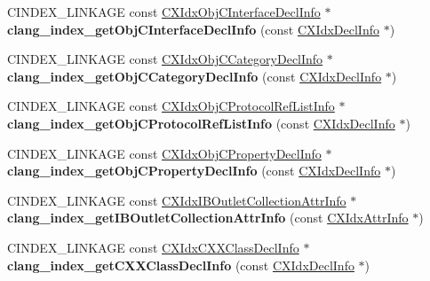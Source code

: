 \begin{DoxyCompactItemize}
C\+I\+N\+D\+E\+X\+\_\+\+L\+I\+N\+K\+A\+GE const \hyperlink{structCXIdxObjCInterfaceDeclInfo}{C\+X\+Idx\+Obj\+C\+Interface\+Decl\+Info} $\ast$ {\bfseries clang\+\_\+index\+\_\+get\+Obj\+C\+Interface\+Decl\+Info} (const \hyperlink{structCXIdxDeclInfo}{C\+X\+Idx\+Decl\+Info} $\ast$)
\item 
\mbox{\label{group__CINDEX__HIGH_gac5301220677a46afd733eb1cffb2909a}} 
C\+I\+N\+D\+E\+X\+\_\+\+L\+I\+N\+K\+A\+GE const \hyperlink{structCXIdxObjCCategoryDeclInfo}{C\+X\+Idx\+Obj\+C\+Category\+Decl\+Info} $\ast$ {\bfseries clang\+\_\+index\+\_\+get\+Obj\+C\+Category\+Decl\+Info} (const \hyperlink{structCXIdxDeclInfo}{C\+X\+Idx\+Decl\+Info} $\ast$)
\item 
\mbox{\label{group__CINDEX__HIGH_ga5c39608c859456cbc78109d010765415}} 
C\+I\+N\+D\+E\+X\+\_\+\+L\+I\+N\+K\+A\+GE const \hyperlink{structCXIdxObjCProtocolRefListInfo}{C\+X\+Idx\+Obj\+C\+Protocol\+Ref\+List\+Info} $\ast$ {\bfseries clang\+\_\+index\+\_\+get\+Obj\+C\+Protocol\+Ref\+List\+Info} (const \hyperlink{structCXIdxDeclInfo}{C\+X\+Idx\+Decl\+Info} $\ast$)
\item 
\mbox{\label{group__CINDEX__HIGH_ga6319eecf732286e2d1c59582bccfad07}} 
C\+I\+N\+D\+E\+X\+\_\+\+L\+I\+N\+K\+A\+GE const \hyperlink{structCXIdxObjCPropertyDeclInfo}{C\+X\+Idx\+Obj\+C\+Property\+Decl\+Info} $\ast$ {\bfseries clang\+\_\+index\+\_\+get\+Obj\+C\+Property\+Decl\+Info} (const \hyperlink{structCXIdxDeclInfo}{C\+X\+Idx\+Decl\+Info} $\ast$)
\item 
\mbox{\label{group__CINDEX__HIGH_ga56c79b1bd72e70149706933a3112f871}} 
C\+I\+N\+D\+E\+X\+\_\+\+L\+I\+N\+K\+A\+GE const \hyperlink{structCXIdxIBOutletCollectionAttrInfo}{C\+X\+Idx\+I\+B\+Outlet\+Collection\+Attr\+Info} $\ast$ {\bfseries clang\+\_\+index\+\_\+get\+I\+B\+Outlet\+Collection\+Attr\+Info} (const \hyperlink{structCXIdxAttrInfo}{C\+X\+Idx\+Attr\+Info} $\ast$)
\item 
\mbox{\label{group__CINDEX__HIGH_gaeba620227e5d19dbe6d23b801c1753a6}} 
C\+I\+N\+D\+E\+X\+\_\+\+L\+I\+N\+K\+A\+GE const \hyperlink{structCXIdxCXXClassDeclInfo}{C\+X\+Idx\+C\+X\+X\+Class\+Decl\+Info} $\ast$ {\bfseries clang\+\_\+index\+\_\+get\+C\+X\+X\+Class\+Decl\+Info} (const \hyperlink{structCXIdxDeclInfo}{C\+X\+Idx\+Decl\+Info} $\ast$)

\end{DoxyCompactItemize}
